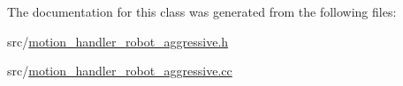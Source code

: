 The documentation for this class was generated from the following files\+:\begin{DoxyCompactItemize}
\item 
src/\mbox{\hyperlink{motion__handler__robot__aggressive_8h}{motion\+\_\+handler\+\_\+robot\+\_\+aggressive.\+h}}\item 
src/\mbox{\hyperlink{motion__handler__robot__aggressive_8cc}{motion\+\_\+handler\+\_\+robot\+\_\+aggressive.\+cc}}\end{DoxyCompactItemize}
